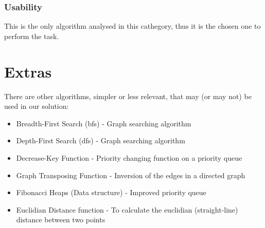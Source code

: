 \subsubsection{Usability}
This is the only algorithm analysed in this cathegory, thus it is the chosen one to perform the task.

\section{Extras}
There are other algorithms, simpler or less relevant, that may (or may not) be used in our solution:
\begin{itemize}
    \item Breadth-First Search (bfs) - Graph searching algorithm
    \item Depth-First Search (dfs) - Graph searching algorithm
    \item Decrease-Key Function - Priority changing function on a priority queue
    \item Graph Transposing Function - Inversion of the edges in a directed graph
    \item Fibonacci Heaps (Data structure) - Improved priority queue
    \item Euclidian Distance function - To calculate the euclidian (straight-line) distance between two points
\end{itemize}
